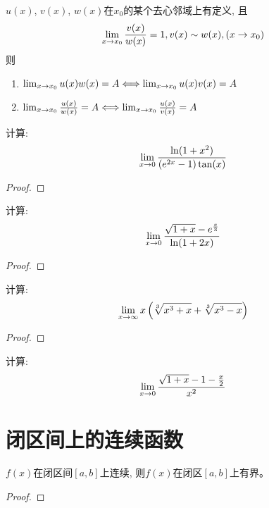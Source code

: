 \documentclass[lang=cn]{elegantbook}
\begin{document}
\begin{theorem}
    $u(x)$, $v(x)$, $w(x)$在$x_0$的某个去心邻域上有定义, 且
    \[ \lim_{x \to x_0 } \frac{v(x)}{w(x)} = 1, v(x) \sim w(x), (x \to x_0)\]
    则
    \begin{enumerate}
        \item $\lim_{x \to x_0 } u(x)w(x) = A \Longleftrightarrow \lim_{x \to x_0 } u(x)v(x) = A$
        \item $\lim_{x \to x_0 } \frac{u(x)}{w(x)} = A \Longleftrightarrow \lim_{x \to x_0 } \frac{u(x)}{v(x)} = A$
    \end{enumerate}
\end{theorem}

\begin{proposition}
    计算:
    \[ \lim_{x \to 0 } \frac{\ln(1+x^2)}{\left(e^{2x}-1\right)\tan(x)}\]
\end{proposition}
\begin{proof}
    
\end{proof}

\begin{proposition}
    计算:
    \[ \lim_{x \to 0 } \frac{\sqrt{1+x}-e^{\frac{x}{3}}}{\ln(1+2x)}\]
\end{proposition}
\begin{proof}
    
\end{proof}

\begin{proposition}
    计算:
    \[ \lim_{x \to \infty } x\left(\sqrt[3]{x^3+x}+\sqrt[3]{x^3-x}\right)\]
\end{proposition}
\begin{proof}
    
\end{proof}

\begin{proposition}
    计算:
    \[ \lim_{x \to 0 } \frac{\sqrt{1+x}-1-\frac{x}{2}}{x^2} \]
\end{proposition}

\section{闭区间上的连续函数}
\begin{theorem}[有界性定理]
    $f(x)$在闭区间$[a, b]$上连续, 则$f(x)$在闭区$[a, b]$上有界。
\end{theorem}
\begin{proof}
    
\end{proof}
\end{document}
